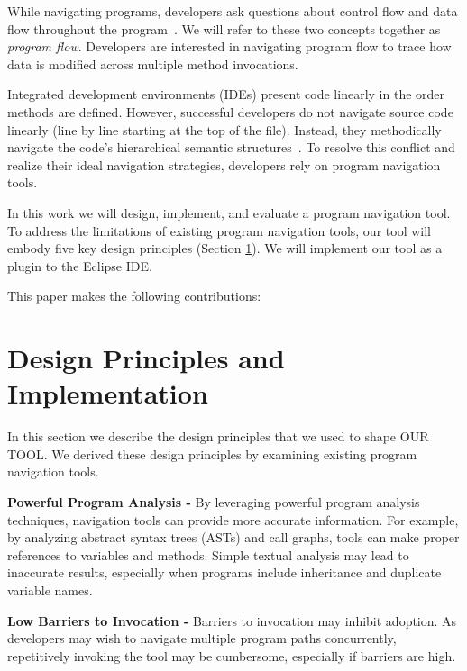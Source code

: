 \documentclass[conference]{IEEEtran}
\newcommand{\toolName}{OUR TOOL}
\begin{document}
While navigating programs, developers ask questions about control flow and data flow throughout the program~\cite{latoza2010hard, Smith2015}. We will refer to these two concepts together as \textit{program flow}. Developers are interested in navigating program flow to trace how data is modified across multiple method invocations.

Integrated development environments (IDEs) present code linearly in the order methods are defined. However, successful developers do not navigate source code linearly (line by line starting at the top of the file). Instead, they methodically navigate the code's hierarchical semantic structures~\cite{robillard2004investigate}. To resolve this conflict and realize their ideal navigation strategies, developers rely on program navigation tools. 


In this work we will design, implement, and evaluate a program navigation tool.
To address the limitations of existing program navigation tools, our tool will embody five key design principles (Section \ref{DesignPrinciples}). We will implement our tool as a plugin to the Eclipse IDE. 

This paper makes the following contributions:


\section{Design Principles and Implementation}
\label{DesignPrinciples}
In this section we describe the design principles that we used to shape \toolName. We derived these design principles by examining existing program navigation tools.
 
\vspace{1em} 
\noindent\textbf{Powerful Program Analysis -}
By leveraging powerful program analysis techniques, navigation tools can provide more accurate information.
For example, by analyzing abstract syntax trees (ASTs) and call graphs, tools can make proper references to variables and methods. 
Simple textual analysis may lead to inaccurate results, especially when programs include inheritance and duplicate variable names.

\vspace{1em} 
\noindent\textbf{Low Barriers to Invocation -}
Barriers to invocation may inhibit adoption. 
As developers may wish to navigate multiple program paths concurrently, repetitively invoking the tool may be cumbersome, especially if barriers are high. 
\end{document}
